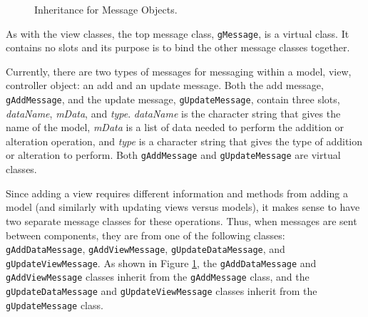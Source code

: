 \documentclass{article}[11pt]
\newcommand{\Robject}[1]{{\texttt{#1}}}
\newcommand{\Rslot}[1]{\textsl{#1}}
\begin{document}
\begin{figure}[ht]
  \begin{center}
    \caption{ Inheritance for Message Objects. }
    \label{Fig:Mess}
  \end{center}
\end{figure}

As with the view classes, the top message class, \Robject{gMessage}, is a
virtual class.  It contains no slots and its purpose is to bind the other
message classes together.

Currently, there are two types of messages for messaging within a model, view,
controller object: an add and an update message.  Both the add message,
\Robject{gAddMessage}, and the update message, \Robject{gUpdateMessage},
contain three slots, \Rslot{dataName}, \Rslot{mData}, and \Rslot{type}.
\Rslot{dataName} is the character string that gives the name of the model,
\Rslot{mData} is a list of data needed to perform the addition or alteration
operation, and \Rslot{type} is a character string that gives the type of
addition or alteration to perform.  Both \Robject{gAddMessage} and
\Robject{gUpdateMessage} are virtual classes. 

Since adding a view requires different information and methods from adding a
model (and similarly with updating views versus models), it makes sense to
have two separate message classes for these operations.  Thus, when messages
are sent between components, they are from one of the following classes:
\Robject{gAddDataMessage}, \Robject{gAddViewMessage},
\Robject{gUpdateDataMessage}, and \Robject{gUpdateViewMessage}.  As shown in
Figure \ref{Fig:Mess}, the \Robject{gAddDataMessage} and
\Robject{gAddViewMessage} classes inherit from the \Robject{gAddMessage}
class, and the \Robject{gUpdateDataMessage} and \Robject{gUpdateViewMessage}
classes inherit from the \Robject{gUpdateMessage} class. 
\end{document}
